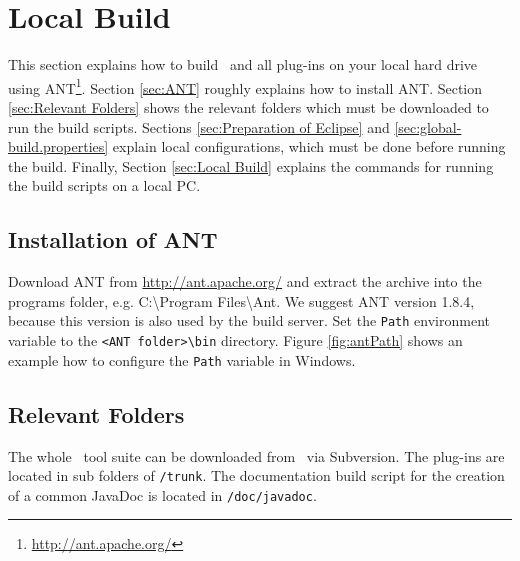\section{Local Build}
\label{sec:Local}
This section explains how to build \EASy\ and all plug-ins on your local hard drive using ANT\footnote{\url{http://ant.apache.org/}}. Section \vref{sec:ANT} roughly explains how to install ANT. Section \vref{sec:Relevant Folders} shows the relevant folders which must be downloaded to run the build scripts. Sections \ref{sec:Preparation of Eclipse} and \ref{sec:global-build.properties} explain local configurations, which must be done before running the build. Finally, Section \vref{sec:Local Build} explains the commands for running the build scripts on a local PC.\\

\subsection{Installation of ANT}
\label{sec:ANT}
Download ANT from \url{http://ant.apache.org/} and extract the archive into the programs folder, e.g. \ttfamily C:\textbackslash Program Files\textbackslash Ant\normalfont. We suggest ANT version 1.8.4, because this version is also used by the build server. Set the \texttt{Path} environment variable to the \texttt{<ANT folder>\textbackslash bin} directory. Figure \vref{fig:antPath} shows an example how to configure the \texttt{Path} variable in Windows.

\subsection{Relevant Folders}
\label{sec:Relevant Folders}
The whole \EASy\ tool suite can be downloaded from \EASyURL\ via Subversion. The plug-ins are located in sub folders of \texttt{/trunk}. The documentation build script for the creation of a common JavaDoc is located in \texttt{/doc/javadoc}.

